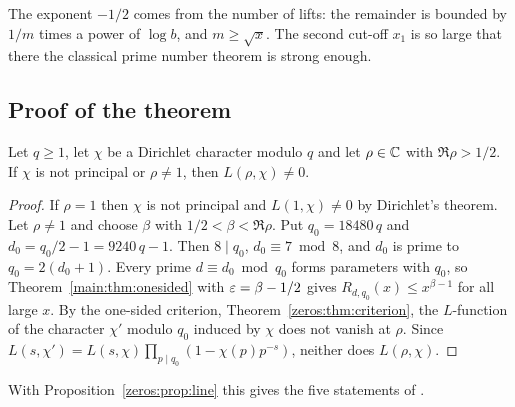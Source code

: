 The exponent $-1/2$ comes from the number of lifts: the remainder is bounded by $1/m$ times a
power of $\log b$, and $m \ge \sqrt{x}$. The second cut-off $x_1$ is so large that there the
classical prime number theorem is strong enough.

\subsection{Proof of the theorem}

\begin{theorem}\label{main:thm:grh}
Let $q \ge 1$, let $\chi$ be a Dirichlet character modulo $q$ and let $\rho \in \mathbb{C}$ with
$\Re\rho > 1/2$. If $\chi$ is not principal or $\rho \ne 1$, then $L(\rho,\chi) \ne 0$.
\end{theorem}

\begin{proof}
If $\rho = 1$ then $\chi$ is not principal and $L(1,\chi) \ne 0$ by Dirichlet's theorem. Let
$\rho \ne 1$ and choose $\beta$ with $1/2 < \beta < \Re\rho$. Put $q_0 = 18480\,q$ and
$d_0 = q_0/2 - 1 = 9240\,q - 1$. Then $8 \mid q_0$, $d_0 \equiv 7 \bmod 8$, and $d_0$ is prime to
$q_0 = 2(d_0+1)$. Every prime $d \equiv d_0 \bmod q_0$ forms parameters with $q_0$, so
Theorem~\ref{main:thm:onesided} with $\varepsilon = \beta - 1/2$ gives $R_{d,q_0}(x) \le x^{\beta-1}$ for
all large $x$. By the one-sided criterion, Theorem~\ref{zeros:thm:criterion}, the $L$-function of
the character $\chi'$ modulo $q_0$ induced by $\chi$ does not vanish at $\rho$. Since
$L(s,\chi') = L(s,\chi)\prod_{p\mid q_0}(1 - \chi(p)p^{-s})$, neither does $L(\rho,\chi)$.
\end{proof}

With Proposition~\ref{zeros:prop:line} this gives the five statements of .
